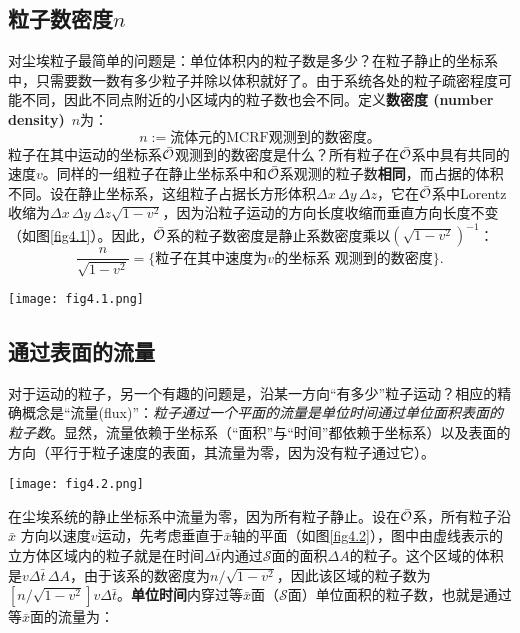 \subsection*{粒子数密度$n$}
对尘埃粒子最简单的问题是：单位体积内的粒子数是多少？在粒子静止的坐标系中，只需要数一数有多少粒子并除以体积就好了。由于系统各处的粒子疏密程度可能不同，因此不同点附近的小区域内的粒子数也会不同。定义\textbf{数密度 (number density)}\ $n$为：
\begin{equation}
    n := \text{流体元的MCRF观测到的数密度。}
\label{equ4.1}
\end{equation}
粒子在其中运动的坐标系$\bar{\mathcal{O}}$观测到的数密度是什么？所有粒子在$\bar{\mathcal{O}}$系中具有共同的速度$v$。同样的一组粒子在静止坐标系中和$\bar{\mathcal{O}}$系观测的粒子数\textbf{相同}，而占据的体积不同。设在静止坐标系，这组粒子占据长方形体积$\Delta x\, \Delta y\, \Delta z$，它在$\bar{\mathcal{O}}$系中Lorentz收缩为$\Delta x\, \Delta y\, \Delta z \sqrt{1 - v^2}$，因为沿粒子运动的方向长度收缩而垂直方向长度不变（如图\ref{fig4.1}）。因此，$\bar{\mathcal{O}}$系的粒子数密度是静止系数密度乘以$(\sqrt{1 - v^2})^{-1}$：
\begin{equation}
    \frac{n}{\sqrt{1 - v^2}} = \Big\{\text{粒子在其中速度为$v$的坐标系 观测到的数密度} \Big\}.
\label{equ4.2}
\end{equation}

{
    \centering
    \texttt{[image: fig4.1.png]}
    \label{fig4.1}
}

\subsection*{通过表面的流量}
对于运动的粒子，另一个有趣的问题是，沿某一方向“有多少”粒子运动？相应的精确概念是“流量(flux)”：\textit{粒子通过一个平面的流量是单位时间通过单位面积表面的粒子数}。显然，流量依赖于坐标系（“面积”与“时间”都依赖于坐标系）以及表面的方向（平行于粒子速度的表面，其流量为零，因为没有粒子通过它）。


{
    \centering
    \texttt{[image: fig4.2.png]}
    \label{fig4.2}
}


在尘埃系统的静止坐标系中流量为零，因为所有粒子静止。设在$\bar{\mathcal{O}}$系，所有粒子沿$\bar{x}$ 方向以速度$v$运动，先考虑垂直于$\bar{x}$轴的平面（如图\ref{fig4.2}），图中由虚线表示的立方体区域内的粒子就是在时间$\Delta \bar{t}$内通过$\mathscr{S}$面的面积$\Delta A$的粒子。这个区域的体积是$v \Delta \bar{t}\, \Delta A$，由于该系的数密度为$n / \sqrt{1 - v^2}$，因此该区域的粒子数为$[n / \sqrt{1 - v^2}] v \Delta \bar{t}$。\textbf{单位时间}内穿过等$\bar{x}$面（$\mathscr{S}$面）单位面积的粒子数，也就是通过等$\bar{x}$面的流量为：

